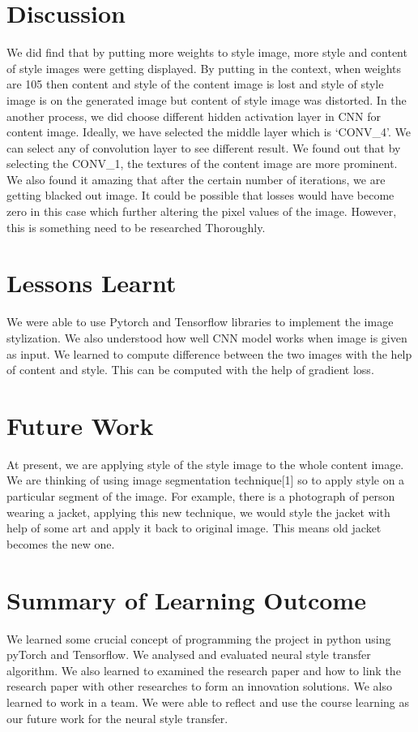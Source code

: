 \documentclass[runningheads]{llncs}
\begin{document}
\section{Discussion}
We did find that by putting more weights to style image, more style and content of style images
were getting displayed. By putting in the context, when weights are 105  then content and style
of the content image is lost and style of style image is on the generated image but content of
style image was distorted. In the another process, we did choose different hidden activation layer
in CNN for content image. Ideally, we have selected the middle layer which is ‘CONV_4’. We can
select any of convolution layer to see different result. We found out that by selecting the CONV_1,
the textures of the content image are more prominent. We also found it amazing that after the certain
number of iterations, we are getting blacked out image. It could be possible that losses would have
become zero in this case which further altering the pixel values of the image. However, this is 
something need to be researched Thoroughly.

\section{Lessons Learnt}
We were able to use Pytorch and Tensorflow libraries to implement the image stylization.
We also understood how well CNN model works when image is given as input. We learned to 
compute difference between the two images with the help of content and style. This can be 
computed with the help of gradient loss.


\section {Future Work}
At present, we are applying style of the style image to the whole content image. We are thinking
of using image segmentation technique[1] so to apply style on a particular segment of the image. 
For example, there is a photograph of person wearing a jacket, applying this new technique, 
we would style the jacket with help of some art and apply it back to original image. This means 
old jacket becomes the new one.

\section{Summary of Learning Outcome} 
We learned some crucial concept of programming the project in python using pyTorch and Tensorflow. 
We analysed and evaluated neural style transfer algorithm. We also learned to examined the research
paper and how to link the research paper with other researches to form an innovation solutions. 
We also learned to work in a team. We were able to reflect and use the course learning as our future
work for the neural style transfer.
\end{document}

